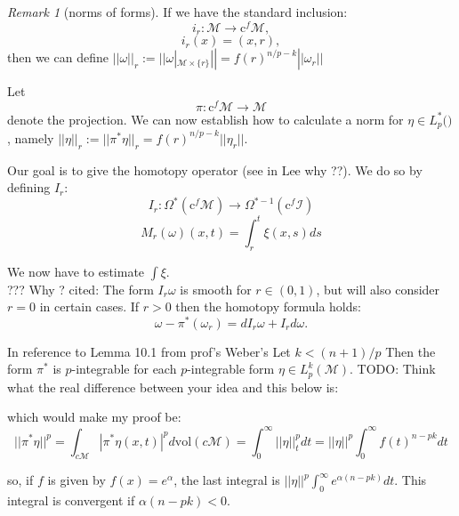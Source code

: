 \documentclass[licencjacka]{pracamgr}
\theoremstyle{definition}
\theoremstyle{remark}
\newtheorem{remark}{Remark}[section]
\begin{document}

\begin{remark}[norms of forms]
If we have the standard inclusion:
\[
    i_r: \mathcal{M} \rightarrow \mathrm{c}^f \mathcal{M},
\]
\[
    i_r(x) = (x, r),
\]
then we can define $|| \omega ||_r := || \omega |_{\mathcal{M} \times
  \{r\}} || = f(r)^{n/p - k} ||\omega_r||$

Let
\[
    \pi:\mathrm{c}^f \mathcal{M} \rightarrow \mathcal{M}
\]
denote the projection. We can now establish how to calculate a norm
for $\eta \in L^\ast_p(\mathcal)$, namely 
$||\eta||_r := ||\pi^\ast\eta||_r = f(r)^{n/p - k} ||\eta_r||$.
\end{remark}



Our goal is to give the homotopy operator (see in Lee why ??). We do so by
defining $I_r$:
\[
  I_r: \Omega^\ast( \mathrm{c}^f \mathcal{M} ) \rightarrow
  \Omega^{\ast-1}(\mathrm{c}^f \mathcal{I} ) 
\]
\[
    M_r(\omega)(x, t) = \int_r^t \xi(x, s) ds
\]

We now have to estimate $\int \xi$. \\

??? Why ?
cited:
The form $I_r\omega$ is smooth for $r \in (0,1)$, but will also consider
$r=0$ in certain cases. If $r>0$ then the homotopy formula holds:
\[
    \omega - \pi^\ast(\omega_r) = d I_r\omega + I_rd\omega.
\] 

In reference to Lemma 10.1 from prof's Weber's
Let $k < (n+1)/p $ Then the form $\pi^\ast$ is $p$-integrable for each 
$p$-integrable form $\eta \in L^k_p(\mathcal{M})$. TODO: Think what the real
difference between your idea and this below is:


which would make my proof be:
\[
    ||\pi^\ast \eta ||^p = 
    \int_{c \mathcal{M}} |\pi^\ast \eta(x,t)|^p d \mathrm{vol}(c\mathcal{M}) = 
    \int_0^\infty ||\eta||_t^p dt = ||\eta||^p \int_0^\infty f(t)^{n-pk} dt
\]

so, if $f$ is given by $f(x) = e^\alpha$, the last integral is  
$ ||\eta||^p \int_0^\infty e^{\alpha (n-pk)} dt$. This integral is convergent
if $\alpha (n - pk) < 0$.\\
\end{document}
